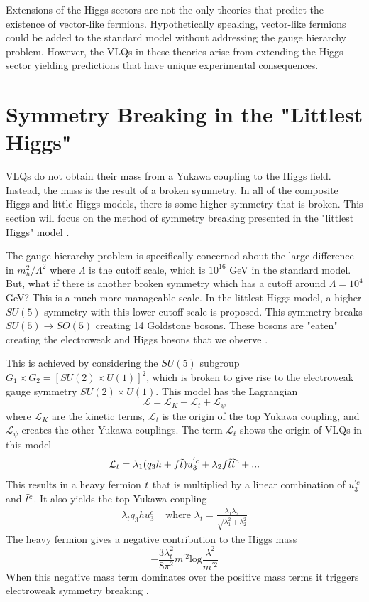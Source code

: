 Extensions of the Higgs sectors are not the only theories that predict the existence of vector-like fermions. Hypothetically speaking, vector-like fermions could be added to the standard model without addressing the gauge hierarchy problem. However, the VLQs in these theories arise from extending the Higgs sector yielding predictions that have unique experimental consequences.

\section{Symmetry Breaking in the "Littlest Higgs"}

VLQs do not obtain their mass from a Yukawa coupling to the Higgs field. Instead, the mass is the result of a broken symmetry. In all of the composite Higgs and little Higgs models, there is some higher symmetry that is broken. This section will focus on the method of symmetry breaking presented in the "littlest Higgs" model \cite{littleHiggs}.

The gauge hierarchy problem is specifically concerned about the large difference in $m_{h}^{2} / \Lambda^{2}$ where $\Lambda$ is the cutoff scale, which is $10^{16}$ GeV in the standard model. But, what if there is another broken symmetry which has a cutoff around $\Lambda=10^{4}$ GeV? This is a much more manageable scale. In the littlest Higgs model, a higher $SU(5)$ symmetry with this lower cutoff scale is proposed. This symmetry breaks $SU(5)\rightarrow SO(5)$ creating 14 Goldstone bosons. These bosons are "eaten" creating the electroweak and Higgs bosons that we observe \cite{littleHiggs}.

This is achieved by considering the $SU(5)$ subgroup $G_{1}\times G_{2}=[SU(2)\times U(1)]^{2}$, which is broken to give rise to the electroweak gauge symmetry $SU(2)\times U(1)$. This model has the Lagrangian
\begin{equation}
    \mathcal{L} = \mathcal{L}_{K} + \mathcal{L}_{t} + \mathcal{L}_{\psi}
\end{equation}
where $\mathcal{L}_{K}$ are the kinetic terms, $\mathcal{L}_{t}$ is the origin of the top Yukawa coupling, and $\mathcal{L}_{\psi}$ creates the other Yukawa couplings. The term $\mathcal{L}_{t}$ shows the origin of VLQs in this model
\begin{equation}
    \mathcal{L}_{t} = \lambda_{1}(q_{3}h+f\Tilde{t})u_{3}^{'c} + \lambda_{2}f\Tilde{t}\Tilde{t}^{c} + ...
\end{equation}
This results in a heavy fermion $\Tilde{t}$ that is multiplied by a linear combination of $u_{3}^{'c}$ and $\Tilde{t}^{c}$. It also yields the top Yukawa coupling
\begin{align}
    \lambda_{t}q_{3}hu_{3}^{c} & \textrm{ where } \lambda_{t}=\frac{\lambda_{1}\lambda_{2}}{\sqrt{\lambda^{2}_{1}+\lambda^{2}_{2}}}
\end{align}
The heavy fermion gives a negative contribution to the Higgs mass
\begin{equation}
    -\frac{3\lambda^{2}_{t}}{8\pi^{2}}m^{'2}\textrm{log}\frac{\lambda^{2}}{m^{'2}}
\end{equation}
When this negative mass term dominates over the positive mass terms it triggers electroweak symmetry breaking \cite{littleHiggs}. 

